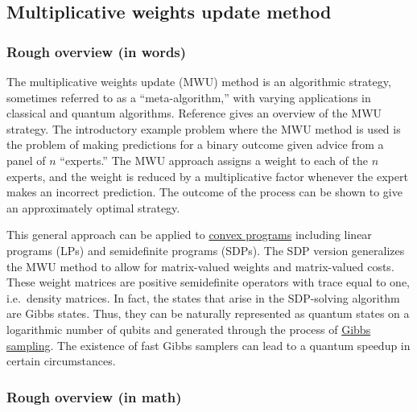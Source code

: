 
\begin{refsection}

\section{Multiplicative weights update method}\label{prim:MWU}


\subsubsection*{Rough overview (in words)}

The multiplicative weights update (MWU) method is an algorithmic strategy, sometimes referred to as a ``meta-algorithm,'' with varying applications in classical and quantum algorithms. Reference \cite{arora2012MultiplicativeWeightsAlg} gives an overview of the MWU strategy. The introductory example problem where the MWU method is used is the problem of making predictions for a binary outcome given advice from a panel of $n$ ``experts.'' The MWU approach assigns a weight to each of the $n$ experts, and the weight is reduced by a multiplicative factor whenever the expert makes an incorrect prediction. The outcome of the process can be shown to give an approximately optimal strategy. 

This general approach can be applied to \hyperref[appl:ConicProgramming]{convex programs} including linear programs (LPs) and semidefinite programs (SDPs). The SDP version generalizes the MWU method to allow for matrix-valued weights and matrix-valued costs. These weight matrices are positive semidefinite operators with trace equal to one, i.e.~density matrices. In fact, the states that arise in the SDP-solving algorithm are Gibbs states. Thus, they can be naturally represented as quantum states on a logarithmic number of qubits and generated through the process of \hyperref[prim:GibbsSampling]{Gibbs sampling}. The existence of fast Gibbs samplers can lead to a quantum speedup in certain circumstances. 



\subsubsection*{Rough overview (in math)}


\end{refsection}

